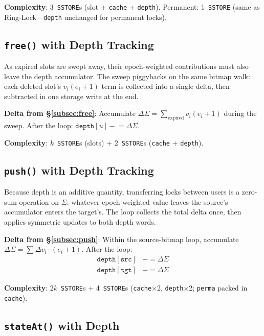\documentclass[10pt,a4paper,twocolumn]{article}
\begin{document}
\textbf{Complexity}: 3~\texttt{SSTORE}s (slot + \texttt{cache} + \texttt{depth}). Permanent: 1~\texttt{SSTORE} (same as Ring-Lock---\texttt{depth} unchanged for permanent locks).

\subsection{\texttt{free()} with Depth Tracking}
\label{subsec:free-depth}

As expired slots are swept away, their epoch-weighted contributions must also leave the depth accumulator.  The sweep piggybacks on the same bitmap walk: each deleted slot's $v_i(e_i{+}1)$ term is collected into a single delta, then subtracted in one storage write at the end.

\textbf{Delta from \S\ref{subsec:free}}: Accumulate $\Delta\Sigma = \sum_{\text{expired}} v_i(e_i{+}1)$ during the sweep. After the loop: $\texttt{depth}[u] \mathrel{-}= \Delta\Sigma$.

\textbf{Complexity}: $k$~\texttt{SSTORE}s (slots) + 2~\texttt{SSTORE}s (\texttt{cache} + \texttt{depth}).

\subsection{\texttt{push()} with Depth Tracking}
\label{subsec:push-depth}

Because depth is an additive quantity, transferring locks between users is a zero-sum operation on $\Sigma$: whatever epoch-weighted value leaves the source's accumulator enters the target's.  The loop collects the total delta once, then applies symmetric updates to both depth words.

\textbf{Delta from \S\ref{subsec:push}}: Within the source-bitmap loop, accumulate $\Delta\Sigma = \sum \Delta v_i \cdot (e_i{+}1)$. After the loop:
\begin{align*}
\texttt{depth}[\texttt{src}] &\mathrel{-}= \Delta\Sigma \\
\texttt{depth}[\texttt{tgt}] &\mathrel{+}= \Delta\Sigma
\end{align*}

\textbf{Complexity}: $2k$~\texttt{SSTORE}s + 4~\texttt{SSTORE}s (\texttt{cache}$\times$2, \texttt{depth}$\times$2; \texttt{perma} packed in \texttt{cache}).

\subsection{\texttt{stateAt()} with Depth}
\label{subsec:stateat-depth}
\end{document}
